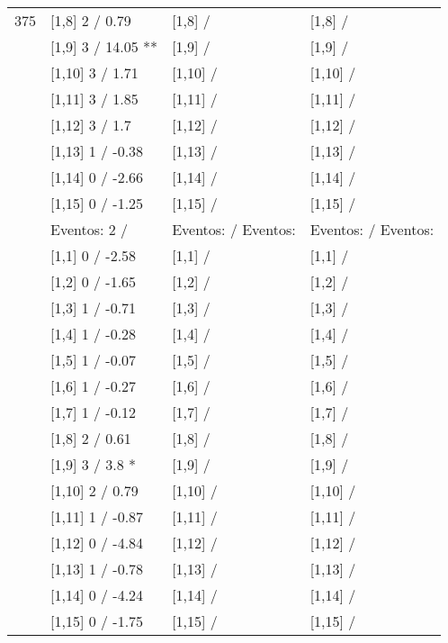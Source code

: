 \begin{table}
\begin{tabular}[t]{llll}
375 & {}[1,8] 2  / 0.79 & {}[1,8]  / & {}[1,8]  /\\
\addlinespace
 & {}[1,9] 3  / 14.05 ** & {}[1,9]  / & {}[1,9]  /\\
 & {}[1,10] 3  / 1.71 & {}[1,10]  / & {}[1,10]  /\\
 & {}[1,11] 3  / 1.85 & {}[1,11]  / & {}[1,11]  /\\
 & {}[1,12] 3  / 1.7 & {}[1,12]  / & {}[1,12]  /\\
 & {}[1,13] 1  / -0.38 & {}[1,13]  / & {}[1,13]  /\\
\addlinespace
 & {}[1,14] 0  / -2.66 & {}[1,14]  / & {}[1,14]  /\\
 & {}[1,15] 0  / -1.25 & {}[1,15]  / & {}[1,15]  /\\
 & Eventos:  2 / & Eventos:   / Eventos: & Eventos:   / Eventos:\\
 & {}[1,1] 0  / -2.58 & {}[1,1]  / & {}[1,1]  /\\
 & {}[1,2] 0  / -1.65 & {}[1,2]  / & {}[1,2]  /\\
\addlinespace
 & {}[1,3] 1  / -0.71 & {}[1,3]  / & {}[1,3]  /\\
 & {}[1,4] 1  / -0.28 & {}[1,4]  / & {}[1,4]  /\\
 & {}[1,5] 1  / -0.07 & {}[1,5]  / & {}[1,5]  /\\
 & {}[1,6] 1  / -0.27 & {}[1,6]  / & {}[1,6]  /\\
 & {}[1,7] 1  / -0.12 & {}[1,7]  / & {}[1,7]  /\\
\addlinespace
500 & {}[1,8] 2  / 0.61 & {}[1,8]  / & {}[1,8]  /\\
 & {}[1,9] 3  / 3.8 * & {}[1,9]  / & {}[1,9]  /\\
 & {}[1,10] 2  / 0.79 & {}[1,10]  / & {}[1,10]  /\\
 & {}[1,11] 1  / -0.87 & {}[1,11]  / & {}[1,11]  /\\
 & {}[1,12] 0  / -4.84 & {}[1,12]  / & {}[1,12]  /\\
\addlinespace
 & {}[1,13] 1  / -0.78 & {}[1,13]  / & {}[1,13]  /\\
 & {}[1,14] 0  / -4.24 & {}[1,14]  / & {}[1,14]  /\\
 & {}[1,15] 0  / -1.75 & {}[1,15]  / & {}[1,15]  /\\
\bottomrule
\end{tabular}
\end{table}
